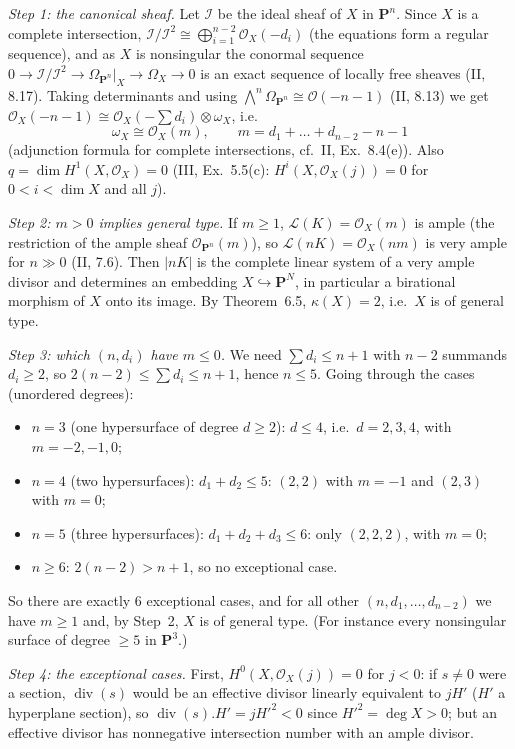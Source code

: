 \documentclass[11pt]{article}
\begin{document}
\emph{Step 1: the canonical sheaf.} Let $\mathcal I$ be the ideal sheaf of $X$ in $\mathbf P^n$. Since $X$ is a complete intersection, $\mathcal I/\mathcal I^2\cong\bigoplus_{i=1}^{n-2}\mathcal O_X(-d_i)$ (the equations form a regular sequence), and as $X$ is nonsingular the conormal sequence $0\to\mathcal I/\mathcal I^2\to\Omega_{\mathbf P^n}|_X\to\Omega_X\to0$ is an exact sequence of locally free sheaves (II, 8.17). Taking determinants and using $\bigwedge^n\Omega_{\mathbf P^n}\cong\mathcal O(-n-1)$ (II, 8.13) we get $\mathcal O_X(-n-1)\cong\mathcal O_X(-\sum d_i)\otimes\omega_X$, i.e.
\[
\omega_X\cong\mathcal O_X(m),\qquad m=d_1+\dots+d_{n-2}-n-1
\]
(adjunction formula for complete intersections, cf.\ II, Ex.~8.4(e)). Also $q=\dim H^1(X,\mathcal O_X)=0$ (III, Ex.~5.5(c): $H^i(X,\mathcal O_X(j))=0$ for $0<i<\dim X$ and all $j$).

\emph{Step 2: $m>0$ implies general type.} If $m\ge1$, $\mathcal L(K)=\mathcal O_X(m)$ is ample (the restriction of the ample sheaf $\mathcal O_{\mathbf P^n}(m)$), so $\mathcal L(nK)=\mathcal O_X(nm)$ is very ample for $n\gg0$ (II, 7.6). Then $|nK|$ is the complete linear system of a very ample divisor and determines an embedding $X\hookrightarrow\mathbf P^N$, in particular a birational morphism of $X$ onto its image. By Theorem~6.5, $\kappa(X)=2$, i.e.\ $X$ is of general type.

\emph{Step 3: which $(n,d_i)$ have $m\le0$.} We need $\sum d_i\le n+1$ with $n-2$ summands $d_i\ge2$, so $2(n-2)\le\sum d_i\le n+1$, hence $n\le5$. Going through the cases (unordered degrees):
\begin{itemize}
\item $n=3$ (one hypersurface of degree $d\ge2$): $d\le4$, i.e.\ $d=2,3,4$, with $m=-2,-1,0$;
\item $n=4$ (two hypersurfaces): $d_1+d_2\le5$: $(2,2)$ with $m=-1$ and $(2,3)$ with $m=0$;
\item $n=5$ (three hypersurfaces): $d_1+d_2+d_3\le6$: only $(2,2,2)$, with $m=0$;
\item $n\ge6$: $2(n-2)>n+1$, so no exceptional case.
\end{itemize}
So there are exactly $6$ exceptional cases, and for all other $(n,d_1,\dots,d_{n-2})$ we have $m\ge1$ and, by Step~2, $X$ is of general type. (For instance every nonsingular surface of degree $\ge5$ in $\mathbf P^3$.)

\emph{Step 4: the exceptional cases.} First, $H^0(X,\mathcal O_X(j))=0$ for $j<0$: if $s\ne0$ were a section, $\operatorname{div}(s)$ would be an effective divisor linearly equivalent to $jH'$ ($H'$ a hyperplane section), so $\operatorname{div}(s).H'=jH'^2<0$ since $H'^2=\deg X>0$; but an effective divisor has nonnegative intersection number with an ample divisor.
\end{document}

